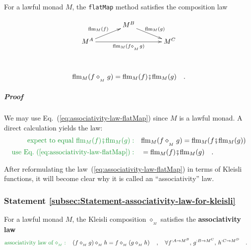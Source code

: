 For a lawful monad $M$, the \lstinline!flatMap! method satisfies
the composition law

\begin{wrapfigure}{l}{0.32\columnwidth}%
\vspace{-1.5\baselineskip}

\[
\xymatrix{\xyScaleY{0.8pc}\xyScaleX{3pc} & M^{B}\ar[rd]\sp(0.5){\ \text{flm}_{M}(g)\ }\\
M^{A}\ar[ru]\sp(0.5){\text{flm}_{M}(f)\quad}\ar[rr]\sb(0.5){\text{flm}_{M}(f\diamond_{_{_{M}}}g)} &  & M^{C}
}
\]
\vspace{0.1\baselineskip}
\end{wrapfigure}%

~\vspace{-0.2\baselineskip}
\[
\text{flm}_{M}(f\diamond_{_{_{M}}}g)=\text{flm}_{M}(f)\bef\text{flm}_{M}(g)\quad.
\]
\vspace{-0.8\baselineskip}


\subparagraph{Proof}

We may use Eq.~(\ref{eq:associativity-law-flatMap}) since $M$ is
a lawful monad. A direct calculation yields the law:
\begin{align*}
{\color{greenunder}\text{expect to equal }\text{flm}_{M}(f)\bef\text{flm}_{M}(g):}\quad & \text{flm}_{M}(f\diamond_{_{_{M}}}g)=\text{flm}_{M}(f\bef\text{flm}_{M}(g))\\
{\color{greenunder}\text{use Eq.~(\ref{eq:associativity-law-flatMap})}:}\quad & =\text{flm}_{M}(f)\bef\text{flm}_{M}(g)\quad.
\end{align*}

After reformulating the law~(\ref{eq:associativity-law-flatMap})
in terms of Kleisli functions, it will become clear why it is called
an \textsf{``}associativity\textsf{''} law.

\subsubsection{Statement \label{subsec:Statement-associativity-law-for-kleisli}\ref{subsec:Statement-associativity-law-for-kleisli}}

For a lawful monad $M$, the Kleisli composition $\diamond_{_{M}}$
satisfies the \textbf{associativity law}
\begin{align}
{\color{greenunder}\text{associativity law of }\diamond_{_{M}}:}\quad & \left(f\diamond_{_{M}}g\right)\diamond_{_{M}}h=f\diamond_{_{M}}\left(g\diamond_{_{M}}h\right)\quad,\quad\forall f^{:A\rightarrow M^{B}},\,g^{:B\rightarrow M^{C}},\,h^{:C\rightarrow M^{D}}\quad.\label{eq:kleisli-associativity-law}
\end{align}


